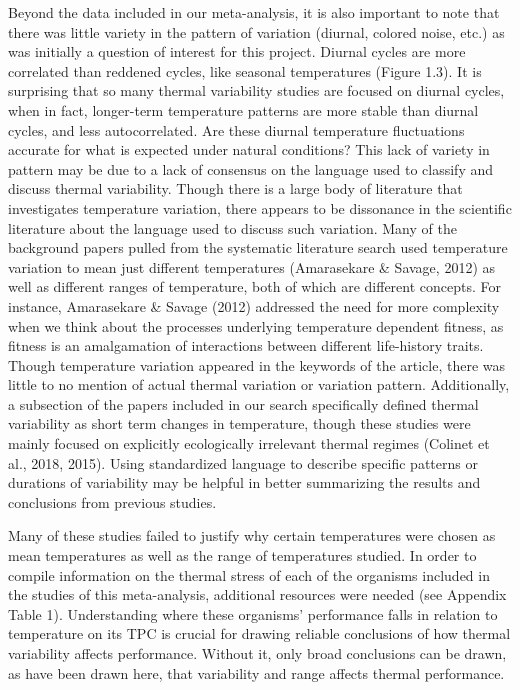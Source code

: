 \documentclass[12pt,twoside]{reedthesis}
\begin{document}
Beyond the data included in our meta-analysis, it is also important to note that there was little variety in the pattern of variation (diurnal, colored noise, etc.) as was initially a question of interest for this project. Diurnal cycles are more correlated than reddened cycles, like seasonal temperatures (Figure 1.3). It is surprising that so many thermal variability studies are focused on diurnal cycles, when in fact, longer-term temperature patterns are more stable than diurnal cycles, and less autocorrelated. Are these diurnal temperature fluctuations accurate for what is expected under natural conditions? This lack of variety in pattern may be due to a lack of consensus on the language used to classify and discuss thermal variability. Though there is a large body of literature that investigates temperature variation, there appears to be dissonance in the scientific literature about the language used to discuss such variation. Many of the background papers pulled from the systematic literature search used temperature variation to mean just different temperatures (Amarasekare \& Savage, 2012) as well as different ranges of temperature, both of which are different concepts. For instance, Amarasekare \& Savage (2012) addressed the need for more complexity when we think about the processes underlying temperature dependent fitness, as fitness is an amalgamation of interactions between different life-history traits. Though temperature variation appeared in the keywords of the article, there was little to no mention of actual thermal variation or variation pattern. Additionally, a subsection of the papers included in our search specifically defined thermal variability as short term changes in temperature, though these studies were mainly focused on explicitly ecologically irrelevant thermal regimes (Colinet et al., 2018, 2015). Using standardized language to describe specific patterns or durations of variability may be helpful in better summarizing the results and conclusions from previous studies.

Many of these studies failed to justify why certain temperatures were chosen as mean temperatures as well as the range of temperatures studied. In order to compile information on the thermal stress of each of the organisms included in the studies of this meta-analysis, additional resources were needed (see Appendix Table 1). Understanding where these organisms' performance falls in relation to temperature on its TPC is crucial for drawing reliable conclusions of how thermal variability affects performance. Without it, only broad conclusions can be drawn, as have been drawn here, that variability and range affects thermal performance.
\end{document}
